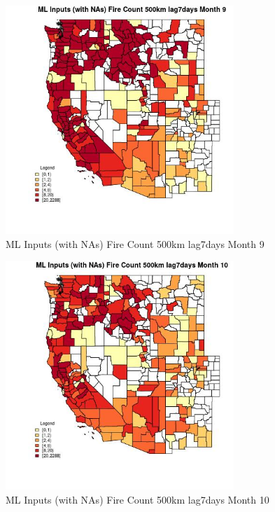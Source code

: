 \clearpage 

\begin{figure} 
\centering  
\includegraphics[width=0.77\textwidth]{Code_Outputs/Report_ML_input_PM25_Step4_part_e_de_duplicated_aves_compiled_2019-05-20wNAs_CountyFire_Count_500km_lag7daysmedianMonth9.jpg} 
\caption{\label{fig:Report_ML_input_PM25_Step4_part_e_de_duplicated_aves_compiled_2019-05-20wNAsCountyFire_Count_500km_lag7daysmedianMonth9}ML Inputs (with NAs) Fire Count 500km lag7days Month 9} 
\end{figure} 
 

\begin{figure} 
\centering  
\includegraphics[width=0.77\textwidth]{Code_Outputs/Report_ML_input_PM25_Step4_part_e_de_duplicated_aves_compiled_2019-05-20wNAs_CountyFire_Count_500km_lag7daysmedianMonth10.jpg} 
\caption{\label{fig:Report_ML_input_PM25_Step4_part_e_de_duplicated_aves_compiled_2019-05-20wNAsCountyFire_Count_500km_lag7daysmedianMonth10}ML Inputs (with NAs) Fire Count 500km lag7days Month 10} 
\end{figure} 
 

